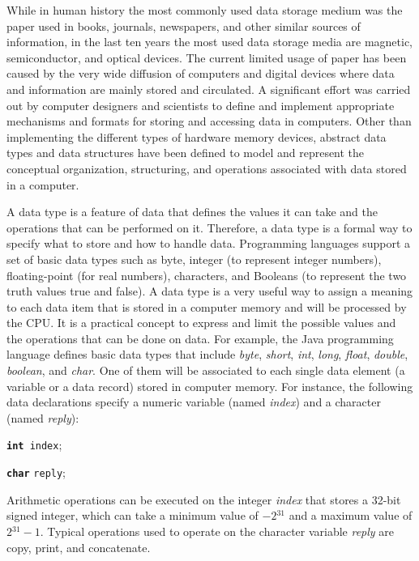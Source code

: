 While in human history the most commonly used data storage medium was the paper used in books, journals, newspapers, and other similar sources of \hbox{information,} in the last ten years the most used data storage media are magnetic, semiconductor, and optical devices. The current limited usage of paper has been caused by the very wide diffusion of computers and digital devices where data and information are mainly stored and circulated. A significant effort was carried out by computer designers and scientists to define and implement appropriate mechanisms and formats for storing and accessing data in computers. Other than implementing the different types of hardware memory devices, abstract data types and data structures have been defined to model and represent the conceptual organization, structuring, and operations associated with data stored in a computer.

A data type is a feature of data that defines the values it can take and the operations that can be performed on it. Therefore, a data type is a formal way to specify what to store and how to handle data. Programming languages support a set of basic data types such as byte, integer (to represent integer numbers), floating-point (for real numbers), characters, and Booleans (to represent the two truth values true and false). A data type is a very useful way to assign a meaning to each data item that is stored in a computer memory and will be processed by the CPU. It is a practical concept to express and limit the possible values and the operations that can be done on data. For example, the Java programming language defines basic data types that include \textit{byte}, \textit{short}, \textit{int}, \textit{long}, \textit{float}, \textit{double}, \textit{boolean}, and \textit{char}. One of them will be associated to each single data element (a variable or a data record) stored in computer memory. For instance, the following data declarations specify a numeric variable (named \textit{index}) and a character (named \textit{reply}):

\begin{center}
\texttt{\textbf{\MonoBold int} index};

\texttt{\textbf{\MonoBold char}} \texttt{reply};
\end{center}

\noindent Arithmetic operations can be executed on the integer \textit{index} that stores a 32-bit signed integer, which can take a minimum value of $-2{}^{31}$ and a maximum value of $2{}^{31}-1$. Typical operations used to operate on the character variable \textit{reply} are copy, print, and concatenate.

